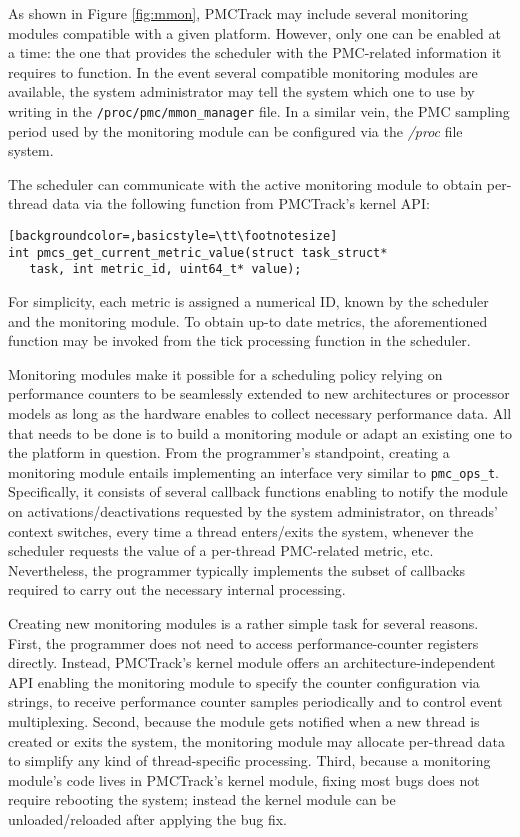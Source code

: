 As shown in Figure \ref{fig:mmon}, PMCTrack may include several
monitoring modules compatible with a given platform. However, only one
can be enabled at a time: the one that provides the scheduler with the
PMC-related information it requires to function. In the event several
compatible monitoring modules are available, the system administrator
may tell the system which one to use by writing in the
\texttt{/proc/pmc/mmon\_manager} file. In a similar vein, the PMC
sampling period used by the monitoring module can be configured via the
\emph{/proc} file system.

The scheduler can communicate with the active monitoring module to
obtain per-thread data via the following function from PMCTrack's kernel
API:

\begin{lstlisting}[backgroundcolor=,basicstyle=\tt\footnotesize]
int pmcs_get_current_metric_value(struct task_struct*
   task, int metric_id, uint64_t* value);
\end{lstlisting}

For simplicity, each metric is assigned a numerical ID, known by the
scheduler and the monitoring module. To obtain up-to date metrics, the
aforementioned function may be invoked from the tick processing function
in the scheduler.

Monitoring modules make it possible for a scheduling policy relying on
performance counters to be seamlessly extended to new architectures or
processor models as long as the hardware enables to collect necessary
performance data. All that needs to be done is to build a monitoring
module or adapt an existing one to the platform in question. From the
programmer's standpoint, creating a monitoring module entails
implementing an interface very similar to \texttt{pmc\_ops\_t}.
Specifically, it consists of several callback functions enabling to
notify the module on activations/deactivations requested by the system
administrator, on threads' context switches, every time a thread
enters/exits the system, whenever the scheduler requests the value of a
per-thread PMC-related metric, etc. Nevertheless, the programmer
typically implements the subset of callbacks required to carry out the
necessary internal processing.

Creating new monitoring modules is a rather simple task for several
reasons. First, the programmer does not need to access
performance-counter registers directly. Instead, PMCTrack's kernel
module offers an architecture-independent API enabling the monitoring
module to specify the counter configuration via strings, to receive
performance counter samples periodically and to control event
multiplexing. Second, because the module gets notified when a new thread
is created or exits the system, the monitoring module may allocate
per-thread data to simplify any kind of thread-specific processing.
Third, because a monitoring module's code lives in PMCTrack's kernel
module, fixing most bugs does not require rebooting the system; instead
the kernel module can be unloaded/reloaded after applying the bug fix.


